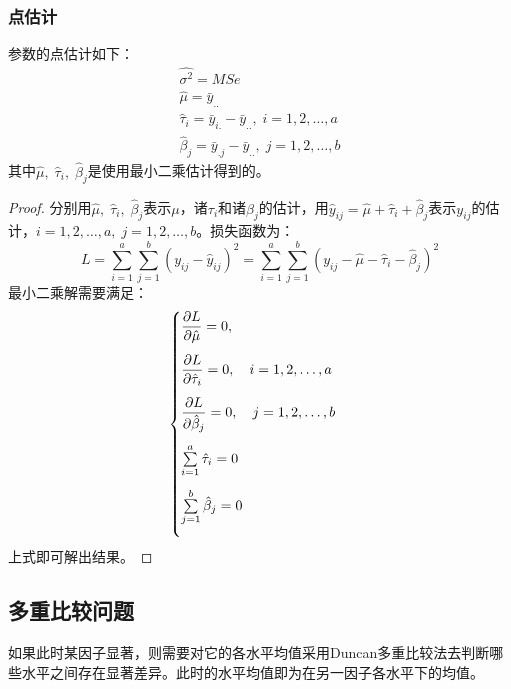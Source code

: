\subsubsection{点估计}
参数的点估计如下：
\begin{gather*}
	\hat{\sigma^2}=MSe \\
	\hat{\mu}=\bar{y}_{..} \\
	\hat{\tau}_i=\bar{y}_{i.}-\bar{y}_{..},\;i=1,2,\dots,a \\
	\hat{\beta}_j=\bar{y}_{.j}-\bar{y}_{..},\;j=1,2,\dots,b
\end{gather*}
其中$\hat{\mu},\;\hat{\tau}_i,\;\hat{\beta}_j$是使用最小二乘估计得到的。
\begin{proof}
	分别用$\hat{\mu},\;\hat{\tau}_i,\;\hat{\beta}_j$表示$\mu$，诸$\tau_i$和诸$\beta_j$的估计，用$\hat{y}_{ij}=\hat{\mu}+\hat{\tau}_i+\hat{\beta}_j$表示$y_{ij}$的估计，$i=1,2,\dots,a,\;j=1,2,\dots,b$。损失函数为：
	\begin{equation*}
		L=\sum_{i=1}^a\sum_{j=1}^b(y_{ij}-\hat{y}_{ij})^2=\sum_{i=1}^a\sum_{j=1}^b(y_{ij}-\hat{\mu}-\hat{\tau}_i-\hat{\beta}_j)^2
	\end{equation*}
	最小二乘解需要满足：
	\begin{equation*}
		\begin{cases}
			\vspace{2ex}
			\dfrac{\partial L}{\partial\hat{\mu}}=0, \\
			\vspace{2ex}
			\dfrac{\partial L}{\partial\hat{\tau}_i}=0,\quad 
			i=1,2,\dots,a \\
			\vspace{2ex}
			\dfrac{\partial L}{\partial\hat{\beta}_j}=0,\quad
			j=1,2,\dots,b \\
			\vspace{2ex}
			\sum\limits_{i=1}^a\hat{\tau}_i=0 \\
			\vspace{2ex}
			\sum\limits_{j=1}^b\hat{\beta}_j=0
		\end{cases}
	\end{equation*}
	上式即可解出结果。
\end{proof}

\subsection{多重比较问题}
如果此时某因子显著，则需要对它的各水平均值采用Duncan多重比较法去判断哪些水平之间存在显著差异。此时的水平均值即为在另一因子各水平下的均值。

